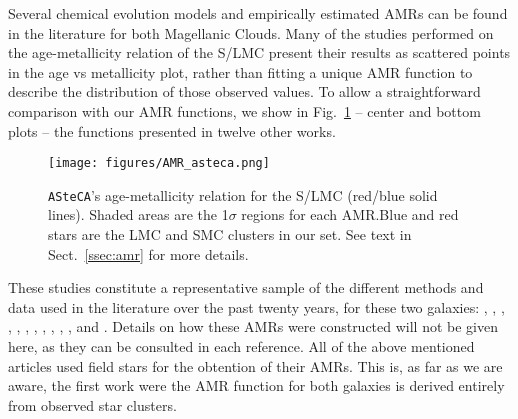 \documentclass{aa}
\begin{document}
Several chemical evolution models and empirically estimated AMRs can be found in
the literature for both Magellanic Clouds. Many of the studies performed on the
age-metallicity relation of the S/LMC present their results as scattered points
in the age vs metallicity plot, rather than fitting a unique AMR function to
describe the distribution of those observed values.
%
To allow a straightforward comparison with our AMR functions, we show in
Fig.~\ref{fig:amr} -- center and bottom plots -- the functions presented in
twelve other works.

\begin{figure}
\centering
\texttt{[image: figures/AMR\_asteca.png]}
\caption{\texttt{ASteCA}'s age-metallicity relation for the S/LMC (red/blue
solid lines). Shaded areas are the 1$\sigma$ regions for each AMR.\@ Blue and
red stars are the LMC and SMC clusters in our set.
See text in Sect.~\ref{ssec:amr} for more details.}
\label{fig:amr}
\end{figure}

These studies constitute a representative sample of the different methods and
data used in the literature over the past twenty years, for these two
galaxies:
\citet[][PT98; bursting models]{Pagel_1998}, \citet[][G98; closed-box model
with Holtzman SFH]{Geha_1998}, \citet[][HZ04]{Harris_2004}, \citet[][C08a;
average of four disk frames]{Carrera_2008_lmc}, \citet[][C08b; average of
thirteen frames]{Carrera_2008_smc}, \citet[][HZ09]{Harris_2009}, \citet[][N09;
5th degree polynomial fit to the AMRs of their three observed regions]
{Noel_2009}, \citet[][TB09; 1: no merger model, 2: equal mass merger, 3: one
to four merger]{Tsujimoto_2009}, \citet[][R12; four tiles average]{Rubele_2012},
\citet[][C13; B: Bologna, C: Cole]{Cignoni_2013}, \citet[][PG13]
{Piatti_Geisler_2013}, and \citet[][M14; 0: field LMC0, 1: field LMC1 , 2: field
LMC2]{Meschin_2014}.
Details on how these AMRs were constructed will not be given here, as
they can be consulted in each reference.
%
All of the above mentioned articles used field stars for the obtention
of their AMRs. This is, as far as we are aware, the first work were the AMR
function for both galaxies is derived entirely from observed star clusters.

\end{document}
